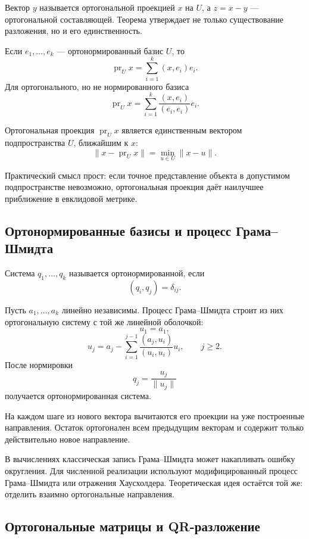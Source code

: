 Вектор \(y\) называется ортогональной проекцией \(x\) на \(U\), а \(z=x-y\) --- ортогональной составляющей. Теорема утверждает не только существование разложения, но и его единственность.

Если \(e_1,\dots,e_k\) --- ортонормированный базис \(U\), то
\[
\operatorname{pr}_U x
=
\sum_{i=1}^k (x,e_i)e_i.
\]
Для ортогонального, но не нормированного базиса
\[
\operatorname{pr}_U x
=
\sum_{i=1}^k
\frac{(x,e_i)}{(e_i,e_i)}e_i.
\]

\begin{theorem}
Ортогональная проекция \(\operatorname{pr}_U x\) является единственным вектором подпространства \(U\), ближайшим к \(x\):
\[
\|x-\operatorname{pr}_U x\|
=
\min_{u\in U}\|x-u\|.
\]
\end{theorem}

Практический смысл прост: если точное представление объекта в допустимом подпространстве невозможно, ортогональная проекция даёт наилучшее приближение в евклидовой метрике.

\subsection{Ортонормированные базисы и процесс Грама--Шмидта}

\begin{definition}
Система \(q_1,\dots,q_k\) называется ортонормированной, если
\[
(q_i,q_j)=\delta_{ij}.
\]
\end{definition}

Пусть \(a_1,\dots,a_k\) линейно независимы. Процесс Грама--Шмидта строит из них ортогональную систему с той же линейной оболочкой:
\[
u_1=a_1,
\]
\[
u_j
=
a_j-
\sum_{i=1}^{j-1}
\frac{(a_j,u_i)}{(u_i,u_i)}u_i,
\qquad j\geq2.
\]
После нормировки
\[
q_j=\frac{u_j}{\|u_j\|}
\]
получается ортонормированная система.

На каждом шаге из нового вектора вычитаются его проекции на уже построенные направления. Остаток ортогонален всем предыдущим векторам и содержит только действительно новое направление.

\begin{computationalnote}
В вычислениях классическая запись Грама--Шмидта может накапливать ошибку округления. Для численной реализации используют модифицированный процесс Грама--Шмидта или отражения Хаусхолдера. Теоретическая идея остаётся той же: отделить взаимно ортогональные направления.
\end{computationalnote}

\subsection{Ортогональные матрицы и QR-разложение}


